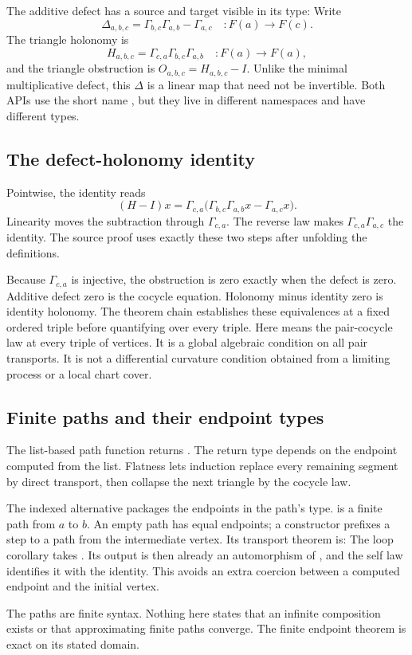 The additive defect has a source and target visible in its type:
Write
\[
 \Delta_{a,b,c}=\Gamma_{b,c}\Gamma_{a,b}-\Gamma_{a,c}
 \quad:F(a)\longrightarrow F(c).
\]
The triangle holonomy is
\[
 H_{a,b,c}=\Gamma_{c,a}\Gamma_{b,c}\Gamma_{a,b}
 \quad:F(a)\longrightarrow F(a),
\]
and the triangle obstruction is $O_{a,b,c}=H_{a,b,c}-I$. Unlike the minimal multiplicative defect, this $\Delta$ is a linear map that need not be invertible. Both APIs use the short name , but they live in different namespaces and have different types.

\subsection{The defect-holonomy identity}
Pointwise, the identity reads
\[
 (H-I)x=\Gamma_{c,a}\bigl(\Gamma_{b,c}\Gamma_{a,b}x
                    -\Gamma_{a,c}x\bigr).
\]
Linearity moves the subtraction through $\Gamma_{c,a}$. The reverse law makes $\Gamma_{c,a}\Gamma_{a,c}$ the identity. The source proof uses exactly these two steps after unfolding the definitions.

Because $\Gamma_{c,a}$ is injective, the obstruction is zero exactly when the defect is zero. Additive defect zero is the cocycle equation. Holonomy minus identity zero is identity holonomy. The theorem chain establishes these equivalences at a fixed ordered triple before quantifying over every triple.
Here  means the pair-cocycle law at every triple of vertices. It is a global algebraic condition on all pair transports. It is not a differential curvature condition obtained from a limiting process or a local chart cover.

\subsection{Finite paths and their endpoint types}
The list-based path function returns
.
The return type depends on the endpoint computed from the list. Flatness lets induction replace every remaining segment by direct transport, then collapse the next triangle by the cocycle law.

The indexed alternative packages the endpoints in the path's type.  is a finite path from $a$ to $b$. An empty path has equal endpoints; a constructor prefixes a step to a path from the intermediate vertex. Its transport theorem is:
The loop corollary takes . Its output is then already an automorphism of , and the self law identifies it with the identity. This avoids an extra coercion between a computed endpoint and the initial vertex.

The paths are finite syntax. Nothing here states that an infinite composition exists or that approximating finite paths converge. The finite endpoint theorem is exact on its stated domain.
